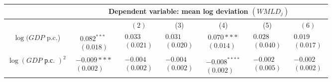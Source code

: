 \documentclass[10pt]{article}
\begin{document}
\begin{center}
\begin{tabular}{|c|c|c|c|c|c|c|}
\hline
 & \multicolumn{6}{|c|}{Dependent variable: mean log deviation $\left(W M L D_{j}\right)$} \\
\hline
 &  & $(2)$ & (3) & (4) & (5) & $(6)$ \\
\hline
$\log (G D P$ p.c.) & $\begin{array}{l}0.082^{* * *} \\ (0.018)\end{array}$ & $\begin{array}{l}0.033 \\ (0.021)\end{array}$ & $\begin{array}{l}0.031 \\ (0.020)\end{array}$ & $\begin{array}{l}0.070 * * * \\ (0.014)\end{array}$ & $\begin{array}{l}0.028 \\ (0.040)\end{array}$ & $\begin{array}{l}0.019 \\ (0.017)\end{array}$ \\
\hline
$\log (G D P \text { р.с. })^{2}$ & $\begin{array}{l}-0.009 * * * \\ (0.002)\end{array}$ & $\begin{array}{l}-0.004 \\ (0.002)\end{array}$ & $\begin{array}{l}-0.004 \\ (0.002)\end{array}$ & $\begin{array}{l}-0.008^{* * * *} \\ (0.002)\end{array}$ & $\begin{array}{l}-0.002 \\ (0.005)\end{array}$ & $\begin{array}{l}-0.002 \\ (0.002)\end{array}$ \\
\hline

\end{tabular}
\end{center}
\end{document}
